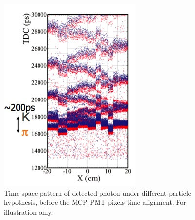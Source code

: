 \documentclass[a4paper,11pt]{article}
\begin{document}
\begin{figure}[t]
\centering
\begin{minipage}{0.4\textwidth}
\includegraphics[width=\textwidth]{pictures/iTOP_pattern_noT0}
\caption{Time-space pattern of detected photon under different particle hypothesis, before the MCP-PMT pixels time alignment. For illustration only.}
\label{fig:PID_noT0}
\end{minipage}
\begin{minipage}{0.1\textwidth}
\end{minipage}
\begin{minipage}{0.4\textwidth}

\end{minipage}
\end{figure}
\end{document}
